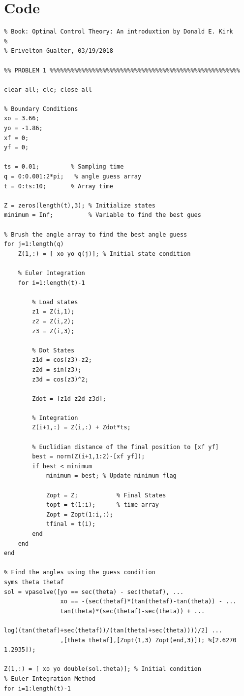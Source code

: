 \documentclass{article}
\begin{document}
\section{Code}

\begin{lstlisting}
% Book: Optimal Control Theory: An introduxtion by Donald E. Kirk
% 
% Erivelton Gualter, 03/19/2018

%% PROBLEM 1 %%%%%%%%%%%%%%%%%%%%%%%%%%%%%%%%%%%%%%%%%%%%%%%%%%%%%%

clear all; clc; close all

% Boundary Conditions
xo = 3.66;  
yo = -1.86;
xf = 0;     
yf = 0;

ts = 0.01;         % Sampling time
q = 0:0.001:2*pi;   % angle guess array
t = 0:ts:10;       % Array time

Z = zeros(length(t),3); % Initialize states
minimum = Inf;          % Variable to find the best gues

% Brush the angle array to find the best angle guess
for j=1:length(q)
    Z(1,:) = [ xo yo q(j)]; % Initial state condition
    
    % Euler Integration
    for i=1:length(t)-1 

        % Load states
        z1 = Z(i,1);
        z2 = Z(i,2);
        z3 = Z(i,3);

        % Dot States
        z1d = cos(z3)-z2;
        z2d = sin(z3);
        z3d = cos(z3)^2;

        Zdot = [z1d z2d z3d];

        % Integration
        Z(i+1,:) = Z(i,:) + Zdot*ts; 

        % Euclidian distance of the final position to [xf yf]
        best = norm(Z(i+1,1:2)-[xf yf]);
        if best < minimum
            minimum = best; % Update minimum flag
            
            Zopt = Z;           % Final States
            topt = t(1:i);      % time array
            Zopt = Zopt(1:i,:); 
            tfinal = t(i); 
        end
    end
end

% Find the angles using the guess condition
syms theta thetaf
sol = vpasolve([yo == sec(theta) - sec(thetaf), ...
                xo == -(sec(thetaf)*(tan(thetaf)-tan(theta)) - ...
                tan(theta)*(sec(thetaf)-sec(theta)) + ...
                log((tan(thetaf)+sec(thetaf))/(tan(theta)+sec(theta))))/2] ...
                ,[theta thetaf],[Zopt(1,3) Zopt(end,3)]); %[2.6270 1.2935]);
            
Z(1,:) = [ xo yo double(sol.theta)]; % Initial condition
% Euler Integration Method
for i=1:length(t)-1


\end{lstlisting}
\end{document}
